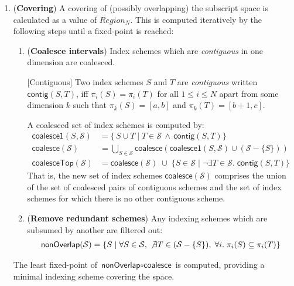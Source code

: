 \begin{enumerate}[leftmargin=1.5em]
\item (\textbf{Covering})
A covering of (possibly overlapping) the subscript space
is calculated as a value of $Region_N$. This is computed iteratively
by the following steps until a fixed-point is reached:

\begin{enumerate}[leftmargin=0.5em]
\item (\textbf{Coalesce intervals})
%
Index schemes which are \emph{contiguous} in one dimension are
coalesced.

\newcommand{\contig}[2]{\mathsf{contig}(#1, #2)}
\begin{defn}{[Contiguous]}
Two index schemes $S$ and $T$ are \emph{contiguous}
written $\contig{S}{T}$,
iff $\pi_i(S) = \pi_i(T)$
for all $1 \leq i \leq N$ apart from some dimension $k$ such that
$\pi_k(S) = [a, b]$ and $\pi_k(T) = [b+1, c]$.
\end{defn}
%
A coalesced set of index schemes is computed by:%
\begin{align*}
\mathsf{coalesce1}(S, \mathcal{S}) & =
 \{\,S \cup T \mid
T \in \mathcal{S} \, \wedge \,
\contig{S}{T} \} \\
\mathsf{coalesce}(\mathcal{S}) & =
\bigcup_{S \in \mathcal{S}} \mathsf{coalesce}(
\mathsf{coalesce1}(S, \mathcal{S})
\cup (\mathcal{S} - \{S\})) \\
\mathsf{coalesceTop}(\mathcal{S}) & =
 \mathsf{coalesce}(\mathcal{S})
\; \cup \;
\{ S \in \mathcal{S} \mid \neg \exists T \in \mathcal{S} . \; \contig{S}{T}\}
\end{align*}
%
That is, the new set of index schemes $\mathsf{coalesce}(\mathcal{S})$
comprises the union of the set of coalesced pairs of contiguous
schemes and the set of index schemes for which there is no other
contiguous scheme.
\item (\textbf{Remove redundant schemes})
Any indexing schemes which are subsumed by another are filtered out:
%
\begin{align*}
\textsf{nonOverlap}(\mathcal{S}) =
\{S \mid \forall S \in \mathcal{S}, \; \not \exists T \in (\mathcal{S} -
  \{S\}), \; \forall i . \; \pi_i(S) \subseteq \pi_i(T) \}
\end{align*}
%
\end{enumerate}
The least fixed-point of $\textsf{nonOverlap} \circ \textsf{coalesce}$
is computed, providing a minimal indexing scheme covering the space.


\end{enumerate}
